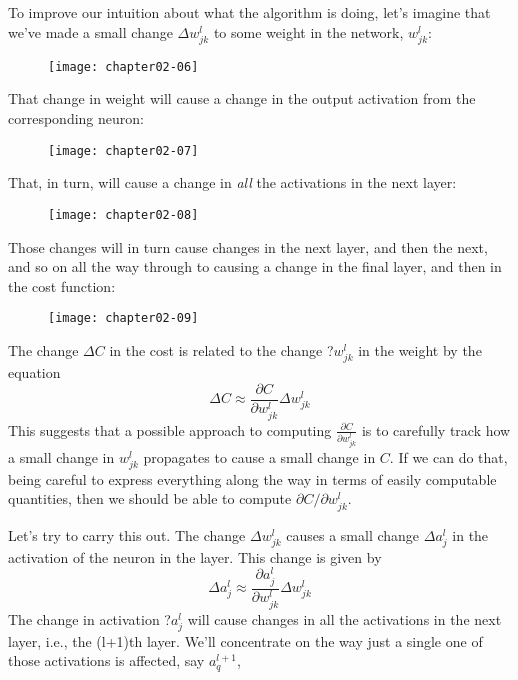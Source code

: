 To improve our intuition about what the algorithm is doing, let's imagine that we've made a small change $\Delta w_{j k}^{l}$ to some weight in the network, $w^l_{jk}$: 

\begin{figure}
\texttt{[image: chapter02-06]}
\end{figure}

That change in weight will cause a change in the output activation from the corresponding neuron: 

\begin{figure}
\texttt{[image: chapter02-07]}
\end{figure}

That, in turn, will cause a change in \textit{all} the activations in the next layer: 

\begin{figure}
\texttt{[image: chapter02-08]}
\end{figure}

Those changes will in turn cause changes in the next layer, and then the next, and so on all the way through to causing a change in the final layer, and then in the cost function: 

\begin{figure}
\texttt{[image: chapter02-09]}
\end{figure}


The change $\Delta C$ in the cost is related to the change ?$w^l_{jk}$ in the weight by the equation 
\begin{equation}
\Delta C \approx \frac{\partial C}{\partial w_{j k}^{l}} \Delta w_{j k}^{l}
\label{eq:c02-47}
\end{equation}
This suggests that a possible approach to computing $\frac{\partial C}{\partial w_{j k}^{l}}$ is to carefully track how a small change in $w^l_{jk}$ propagates to cause a small change in $C$. If we can do that, being careful to express everything along the way in terms of easily computable quantities, then we should be able to compute $\partial C / \partial w_{j k}^{l}$.

Let's try to carry this out. The change $\Delta w^l_{jk}$ causes a small change $\Delta a^l_j$ in the activation of the  neuron in the  layer. This change is given by 
\begin{equation}
\Delta a_{j}^{l} \approx \frac{\partial a_{j}^{l}}{\partial w_{j k}^{l}} \Delta w_{j k}^{l}
\label{eq:c02-48}
\end{equation}
The change in activation ?$a^l_j$ will cause changes in all the activations in the next layer, i.e., the (l+1)th layer. We'll concentrate on the way just a single one of those activations is affected, say $a^{l+1}_q$,


